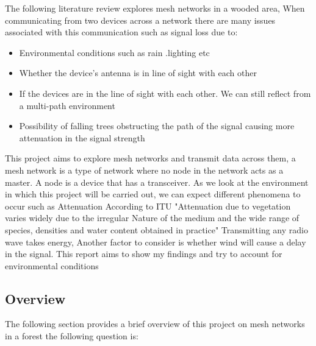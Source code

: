 The following literature review explores mesh networks in a wooded area, When communicating from two devices across a network there are many issues associated with this communication such as signal loss due to:
	\begin{itemize}
		\item Environmental conditions such as rain .lighting etc
		\item Whether the device's antenna is in line of sight with each other
		\item If the devices are in the line of sight with each other. We can still reflect from a multi-path environment
		\item Possibility of falling trees obstructing the path of the signal causing more attenuation in the signal strength
	\end{itemize}
	This project aims to explore mesh networks and transmit data across them,  a mesh network is a type of network where no node in the network acts as a master. A node is a device that has a transceiver. As we look at the environment in which this project will be carried out, we can expect different phenomena to occur such as  Attenuation According to ITU \cite{ITU} "Attenuation due to vegetation varies widely due to the irregular Nature of the medium and the wide range of species, densities and water content obtained in practice"
	Transmitting any radio wave takes energy, Another factor to consider is whether wind will cause a delay in the signal. This report aims to show my findings and try to account for environmental conditions
	\subsection{Overview} \label{sec: overview}

		The following section provides a brief overview of  this project on mesh networks in a forest the following question is:
		
